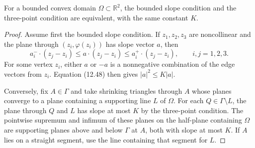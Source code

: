 \begin{proposition}
\label{gt-ch12-prop-bounded-slope-three-point-equivalence}
For a bounded convex domain $\Omega\subset\mathbb R^2$, the bounded slope
condition and the three-point condition are equivalent, with the same
constant $K$.
\end{proposition}
\begin{proof}
\sketch Assume first the bounded slope condition.  If
$z_1,z_2,z_3$ are noncollinear and the plane through
$(z_i,\varphi(z_i))$ has slope vector $a$, then
\begin{equation}\tag{12.48}
a_i^-\cdot(z_j-z_i)
\le a\cdot(z_j-z_i)
\le a_i^+\cdot(z_j-z_i),
\qquad i,j=1,2,3.
\end{equation}
For some vertex $z_i$, either $a$ or $-a$ is a nonnegative combination of
the edge vectors from $z_i$.  Equation (12.48) then gives
$|a|^2\le K|a|$.

Conversely, fix $A\in\Gamma$ and take shrinking triangles through $A$ whose
planes converge to a plane containing a supporting line $L$ of $\Omega$.
For each $Q\in\Gamma\setminus L$, the plane through $Q$ and $L$ has slope at
most $K$ by the three-point condition.  The pointwise supremum and infimum
of these planes on the half-plane containing $\Omega$ are supporting planes
above and below $\Gamma$ at $A$, both with slope at most $K$.  If $A$ lies
on a straight segment, use the line containing that segment for $L$.
\end{proof}
